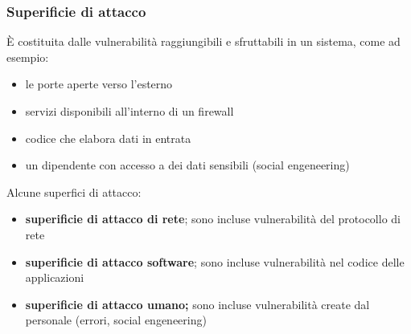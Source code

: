 \subsubsection{Superificie di attacco}
È costituita dalle vulnerabilità raggiungibili e sfruttabili in un sistema, come ad esempio:
\begin{itemize}
    \item le porte aperte verso l'esterno
    \item servizi disponibili all'interno di un firewall
    \item codice che elabora dati in entrata
    \item un dipendente con accesso a dei dati sensibili (social engeneering)
\end{itemize}

Alcune superfici di attacco:
\begin{itemize}
    \item \textbf{superificie di attacco di rete}; sono incluse vulnerabilità del protocollo di rete
    \item \textbf{superificie di attacco software}; sono incluse vulnerabilità nel codice delle applicazioni
    \item \textbf{superificie di attacco umano;} sono incluse vulnerabilità create dal personale (errori, social engeneering)
\end{itemize}

